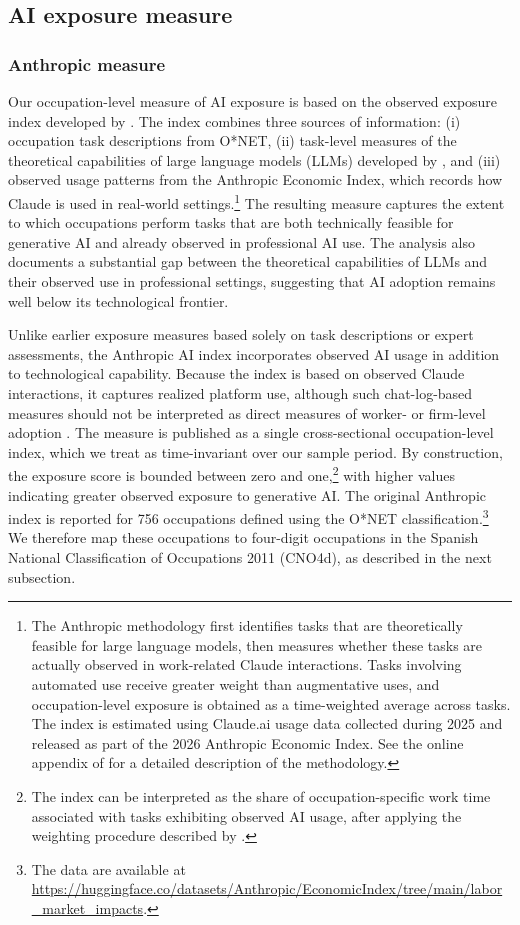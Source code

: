 \subsection{AI exposure measure}

\subsubsection{Anthropic measure}

Our occupation-level measure of AI exposure is based on the observed exposure index developed by \citet{massenkoff_mccrory_2026}. The index combines three sources of information: (i) occupation task descriptions from O*NET, (ii) task-level measures of the theoretical capabilities of large language models (LLMs) developed by \citet{eloundou_manning_mishkin_rock_2024}, and (iii) observed usage patterns from the Anthropic Economic Index, which records how Claude is used in real-world settings.\footnote{The Anthropic methodology first identifies tasks that are theoretically feasible for large language models, then measures whether these tasks are actually observed in work-related Claude interactions. Tasks involving automated use receive greater weight than augmentative uses, and occupation-level exposure is obtained as a time-weighted average across tasks. The index is estimated using Claude.ai usage data collected during 2025 and released as part of the 2026 Anthropic Economic Index. See the online appendix of \citet{massenkoff_mccrory_2026} for a detailed description of the methodology.} The resulting measure captures the extent to which occupations perform tasks that are both technically feasible for generative AI and already observed in professional AI use. The analysis also documents a substantial gap between the theoretical capabilities of LLMs and their observed use in professional settings, suggesting that AI adoption remains well below its technological frontier.

Unlike earlier exposure measures based solely on task descriptions or expert assessments, the Anthropic AI index incorporates observed AI usage in addition to technological capability. Because the index is based on observed Claude interactions, it captures realized platform use, although such chat-log-based measures should not be interpreted as direct measures of worker- or firm-level adoption \citep{bick_et_al_2026}. The measure is published as a single cross-sectional occupation-level index, which we treat as time-invariant over our sample period. By construction, the exposure score is bounded between zero and one,\footnote{The index can be interpreted as the share of occupation-specific work time associated with tasks exhibiting observed AI usage, after applying the weighting procedure described by \citet{massenkoff_mccrory_2026}.} with higher values indicating greater observed exposure to generative AI. The original Anthropic index is reported for 756 occupations defined using the O*NET classification.\footnote{The data are available at \url{https://huggingface.co/datasets/Anthropic/EconomicIndex/tree/main/labor_market_impacts}.} We therefore map these occupations to four-digit occupations in the Spanish National Classification of Occupations 2011 (CNO4d), as described in the next subsection.

